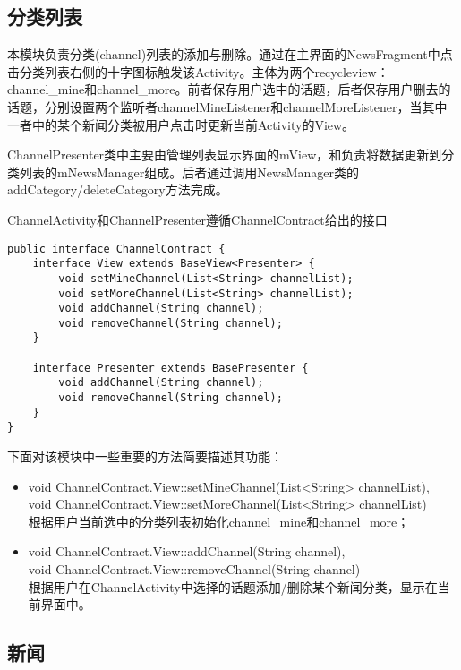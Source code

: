 \documentclass[UTF8]{ctexart}
\begin{document}
\subsection{分类列表}

	本模块负责分类(channel)列表的添加与删除。通过在主界面的NewsFragment中点击分类列表右侧的十字图标触发该Activity。主体为两个recycleview：channel\_mine和channel\_more。前者保存用户选中的话题，后者保存用户删去的话题，分别设置两个监听者channelMineListener和channelMoreListener，当其中一者中的某个新闻分类被用户点击时更新当前Activity的View。

	ChannelPresenter类中主要由管理列表显示界面的mView，和负责将数据更新到分类列表的mNewsManager组成。后者通过调用NewsManager类的addCategory/deleteCategory方法完成。

	ChannelActivity和ChannelPresenter遵循ChannelContract给出的接口

\begin{verbatim}
public interface ChannelContract {
    interface View extends BaseView<Presenter> {
        void setMineChannel(List<String> channelList);
        void setMoreChannel(List<String> channelList);
        void addChannel(String channel);
        void removeChannel(String channel);
    }

    interface Presenter extends BasePresenter {
        void addChannel(String channel);
        void removeChannel(String channel);
    }
}
\end{verbatim}

	下面对该模块中一些重要的方法简要描述其功能：

	\begin{itemize}
	    \item void ChannelContract.View::setMineChannel(List<String> channelList), 
	    	\\void ChannelContract.View::setMoreChannel(List<String> channelList)
	        \\根据用户当前选中的分类列表初始化channel\_mine和channel\_more；
	    \item void ChannelContract.View::addChannel(String channel), 
	    	\\void ChannelContract.View::removeChannel(String channel)
	        \\根据用户在ChannelActivity中选择的话题添加/删除某个新闻分类，显示在当前界面中。
\end{itemize}

\subsection{新闻}
\end{document}
